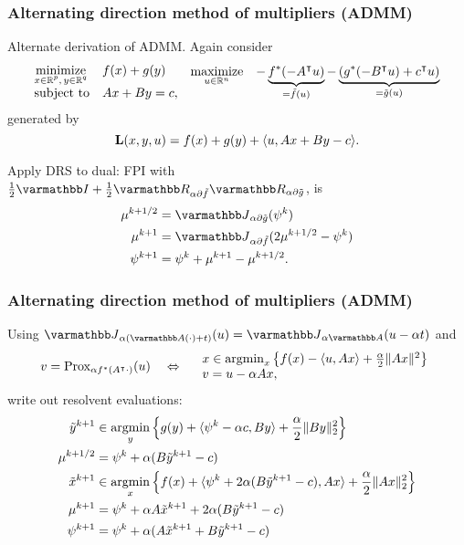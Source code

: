 \documentclass[10pt,mathserif]{beamer}
\begin{document}
\begin{frame}[fragile]
\frametitle{Alternating direction method of multipliers (ADMM)}
Alternate derivation of ADMM.
Again consider
\begingroup\makeatletter\def\f@size{6}\check@mathfonts
\[
\begin{array}{ll}
\underset{\substack{x\in \mathbb{R}^p,\,y\in \mathbb{R}^q}}{\mbox{minimize}}&f(x)+g(y)\\
\mbox{subject to}&Ax+By=c,
\end{array}
\begin{array}{ll}
\underset{u  \in \mathbb{R}^n}{\mbox{maximize}}&-\underbrace{f^*(-A^\intercal u )}_{=\tilde{f}( u )}-\underbrace{(g^*(-B^\intercal u )+c^\intercal u )}_{=\tilde{g}( u )}
\end{array}
\]
\endgroup
generated by
\[
\mathbf{L}(x,y,u )=f(x)+g(y)+\langle u , Ax+By-c\rangle.
\]

\vspace{0.2in}
Apply DRS to dual:
FPI with  $\frac{1}{2}\opI+\frac{1}{2}\opR_{\alpha \partial \tilde{f}}\opR_{\alpha \partial \tilde{g}}$, is
\begin{align*}
\mu^{k+1/2}&=\opJ_{\alpha \partial \tilde{g}}(\psi^k)\\
\mu^{k+1}&=\opJ_{\alpha \partial \tilde{f}}(2\mu^{k+1/2}-\psi^k)\\
\psi^{k+1}&=\psi^k+\mu^{k+1}-\mu^{k+1/2}.
\end{align*}
\end{frame}


\begin{frame}[label=frame_admm2]
\frametitle{Alternating direction method of multipliers (ADMM)}
Using $\opJ_{\alpha(\opA(\cdot)+t)}(u)=\opJ_{\alpha \opA}(u-\alpha t)$ and 
\begin{align*}
\label{eq:J_conj}
v=\mathrm{Prox}_{\alpha f^*(A^\intercal \cdot)}(u)
\quad\Leftrightarrow\quad
\begin{array}{l}
x\in\operatorname*{argmin}_x\left\{
f(x)-\langle u,Ax\rangle +\frac{\alpha}{2}\|Ax\|^2
\right\}\\
v= u-\alpha Ax,
\end{array}
\end{align*}
 write out resolvent evaluations:
\begin{align*}
\tilde{y}^{k+1}&\in\operatorname*{argmin}_y\left\{g(y)+\langle \psi^k-\alpha c,By\rangle +\frac{\alpha}{2}\|By\|_2^2\right\}\\
\mu^{k+1/2}&=\psi^k+\alpha (B\tilde{y}^{k+1}-c)\\
\tilde{x}^{k+1}&\in\operatorname*{argmin}_x\left\{f(x)+\langle \psi^k+2\alpha( B\tilde{y}^{k+1}-c),Ax\rangle+\frac{\alpha}{2}\|Ax\|_2^2\right\}\\
\mu^{k+1}&=\psi^k+\alpha A\tilde{x}^{k+1}+2\alpha (B\tilde{y}^{k+1}-c)\\
\psi^{k+1}&=\psi^k+\alpha(A\tilde{x}^{k+1}+B\tilde{y}^{k+1}-c)
\end{align*}
\end{frame}
\end{document}
